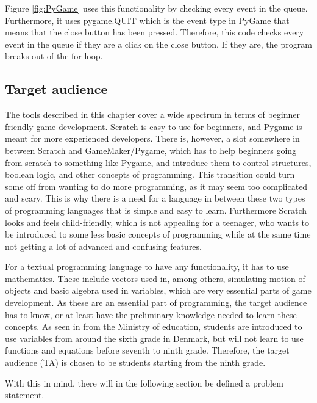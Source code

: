 Figure \ref{fig:PyGame} uses this functionality by checking every event in the queue. Furthermore, it uses pygame.QUIT which is the event type in PyGame that means that the close button has been pressed. Therefore, this code checks every event in the queue if they are a click on the close button. If they are, the program breaks out of the for loop.

\subsection{Target audience}
\label{sub:TargetAudience}
The tools described in this chapter cover a wide spectrum in terms of beginner friendly game development. Scratch\cite{scratch} is easy to use for beginners, and Pygame is meant for more experienced developers. There is, however, a slot somewhere in between Scratch and GameMaker/Pygame, which has to help beginners going from scratch to something like Pygame, and introduce them to control structures, boolean logic, and other concepts of programming. This transition could turn some off from wanting to do more programming, as it may seem too complicated and scary. This is why there is a need for a language in between these two types of programming languages that is simple and easy to learn. Furthermore Scratch looks and feels child-friendly, which is not appealing for a teenager, who wants to be introduced to some less basic concepts of programming while at the same time not getting a lot of advanced and confusing features.

For a textual programming language to have any functionality, it has to use mathematics. These include vectors used in, among others, simulating motion of objects and basic algebra used in variables, which are very essential parts of game development.
As these are an essential part of programming, the target audience has to know, or at least have the preliminary knowledge needed to learn these concepts. As seen in \cite{FFMM} from the Ministry of education, students are introduced to use variables from around the sixth grade in Denmark, but will not learn to use functions and equations before seventh to ninth grade. Therefore, the target audience (TA) is chosen to be students starting from the ninth grade.



With this in mind, there will in the following section be defined a problem statement.